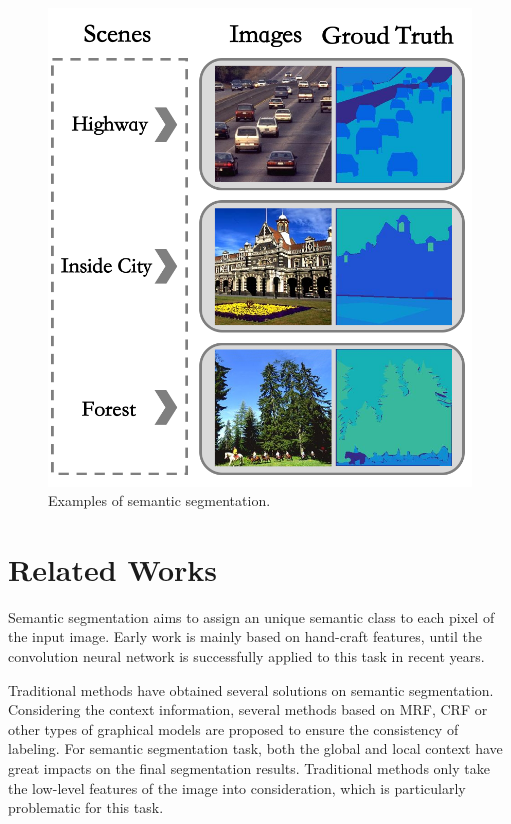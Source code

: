 \documentclass[10.5pt,compsoc]{TsT}
\newcommand{\upcite}[1]{\superscript{\textsuperscript{\cite{#1}}}}
\theoremstyle{mystyle}
\newcommand{\upcite}[1]{\textsuperscript{\cite{#1}}}
\begin{document}
{\begin{figure}
\centering
\includegraphics[width=0.95\columnwidth]{fig1.png}
\caption{Examples of semantic segmentation.}
\label{fig:example}
\end{figure} 


\section{Related Works}
\label{s:Related}
\noindent
Semantic segmentation aims to assign an unique semantic class to each pixel of the input image. Early work is mainly based on hand-craft features, until the convolution neural network is successfully applied to this task in recent years.

Traditional methods have obtained several solutions on semantic segmentation. Considering the context information, several methods based on MRF, CRF or other types of graphical models are proposed to ensure the consistency of labeling\upcite{8,10}. For semantic segmentation task, both the global and local context have great impacts on the final segmentation results. Traditional methods only take the low-level features of the image into consideration, which is particularly problematic for this task.

}
\end{document}
